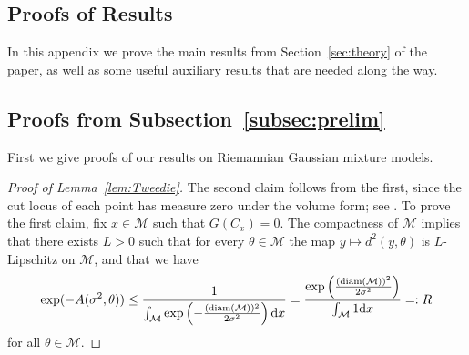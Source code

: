 \documentclass[preprint]{imsart}
\theoremstyle{plain}
\theoremstyle{definition}
\newcommand{\Mcal}{\mathcal{M}}
\newcommand{\diff}{\textnormal{d}}
\DeclareMathOperator{\diam}{diam}
\begin{document}
\begin{appendix}


\section{Proofs of Results}\label{App:Proofs}

In this appendix we prove the main results from Section~\ref{sec:theory} of the paper, as well as some useful auxiliary results that are needed along the way.

\subsection{Proofs from Subsection~\ref{subsec:prelim}}\label{subsec:proofs-prelim}

First we give proofs of our results on Riemannian Gaussian mixture models.


\begin{proof}[Proof of Lemma~\ref{lem:Tweedie}]
    The second claim follows from the first, since the cut locus of each point has measure zero under the volume form; see \cite[p.~64]{Chavel}. 
    To prove the first claim, fix $x\in\Mcal$ such that $G(C_x)=0$.
    The compactness of $\Mcal$ implies that there exists $L>0$ such that for every $\theta\in\Mcal$ the map $y\mapsto d^2(y,\theta)$ is $L$-Lipschitz on $\Mcal$, and that we have 
    \begin{align*}
        \exp(-A(\sigma^2,\theta)) \le \frac{1}{\int_{\Mcal}\exp\left(-\frac{(\diam(\Mcal))^2}{2\sigma^2}\right)\diff x} = \frac{\exp\left(\frac{(\diam(\Mcal))^2}{2\sigma^2}\right)}{\int_{\Mcal}1\diff x}=:R
    \end{align*}
    for all $\theta\in\Mcal$.


\end{proof}
\end{appendix}
\end{document}
